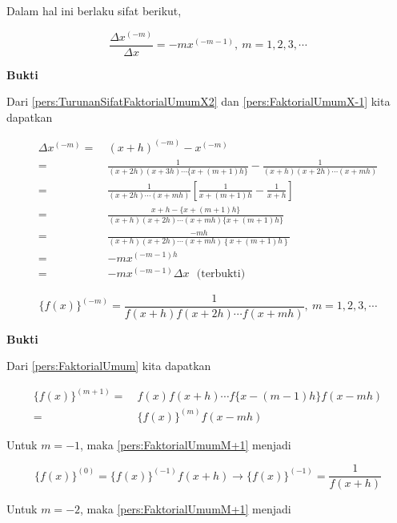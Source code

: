 Dalam hal ini berlaku sifat berikut,

\begin{equation}
\boxed{\frac{\Delta x^{(-m)}}{\Delta x} = -m x^{(-m-1)}},~m=1,2,3,\cdots
\end{equation}

\textbf{Bukti}

Dari \ref{pers:TurunanSifatFaktorialUmumX2} dan \ref{pers:FaktorialUmumX-1} kita dapatkan

\begin{equation*}
\begin{split}
\Delta x^{(-m)} =~& (x+h)^{(-m)} - x^{(-m)}\\
=~& \frac{1}{(x+2h)(x+3h)\cdots\{x+(m+1)h\}} - \frac{1}{(x+h)(x+2h)\cdots (x+mh)}\\
=~& \frac{1}{(x+2h)\cdots(x+mh)}\left[\frac{1}{x+(m+1)h}-\frac{1}{x+h}\right]\\
=~& \frac{x+h - \{x+(m+1)h\}}{(x+h)(x+2h)\cdots(x+mh)\{x+(m+1)h\}}\\
=~& \frac{-mh}{(x+h)(x+2h)\cdots (x+mh)\left\{x+(m+1)h\right\}}\\
=~& -mx^{(-m-1)h}\\
=~& -mx^{(-m-1)}\Delta x~~~\text{(terbukti)}
\end{split}
\end{equation*}


\begin{equation}\label{pers:FaktorialUmum-M}
\boxed{\{f(x)\}^{(-m)} = \frac{1}{f(x+h)f(x+2h)\cdots f(x+mh)},~m=1,2,3,\cdots}
\end{equation}

\textbf{Bukti}

Dari \ref{pers:FaktorialUmum} kita dapatkan

\begin{equation}
\begin{split}\label{pers:FaktorialUmumM+1}
\{f(x)\}^{(m+1)} =~& f(x)f(x+h)\cdots f\{x-(m-1)h\}f(x-mh)\\
=~& \{f(x)\}^{(m)} f(x-mh)
\end{split}
\end{equation}

Untuk $m=-1$, maka \ref{pers:FaktorialUmumM+1} menjadi

\begin{equation}\label{pers:FaktorialUmumM+1M-1}
\{f(x)\}^{(0)} = \{f(x)\}^{(-1)} f(x+h) \rightarrow \{f(x)\}^{(-1)} = \frac{1}{f(x+h)}
\end{equation}

Untuk $m=-2$, maka \ref{pers:FaktorialUmumM+1} menjadi

